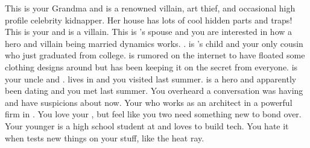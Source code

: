 \documentclass[char]{LRSguildcamp1}
\begin{document}
\begin{itemz}[Notes]
	\item 
\end{itemz}
\begin{contacts}
	\contact{\cGrandma{}} This is your Grandma and is a renowned villain, art thief, and occasional high profile celebrity kidnapper. Her house has lots of cool hidden parts and traps!
	\contact{\cOldest{}} This is your  \cOldest{\uncle} and is a villain. 
	\contact{\cOS{}} This is \cOldest{}'s spouse and you are interested in how a hero and villain being married dynamics works. \cOS{\uncle}.
	\contact{\cGrad{}} \cGrad{} is \cOldest{}'s child and your only cousin who just graduated from college. \cGrad{} is rumored on the internet to have floated some clothing designs around but has been keeping it on the secret from everyone.
	\contact{\cYoungest{}} \cYoungest{} is your uncle and \cYoungest{\hero}. \cYoungest{} lives in \pCityYoungest{} and you visited \cYoungest{\them} last summer.  
	\contact{\cYS{}} \cYS{} is a hero and apparently been dating \cYoungest{} and you met last summer. You overheard a conversation \cYS{} was having and have suspicions about  now.
	\contact{\cArchitect{}} Your \cArchitect{\parent} who works as an architect in a powerful firm in \pCityArchitect{}.  You love your \cArchitect{\parent}, but feel like you two need something new to bond over.
	 	\contact{\cTeen{}} Your younger \cTeen{\sibling} is a high school student at \pNormalSchool{} and loves to build tech. You hate it when \cTeen{} tests new things on your stuff, like the heat ray. 
\end{contacts}
\end{document}

